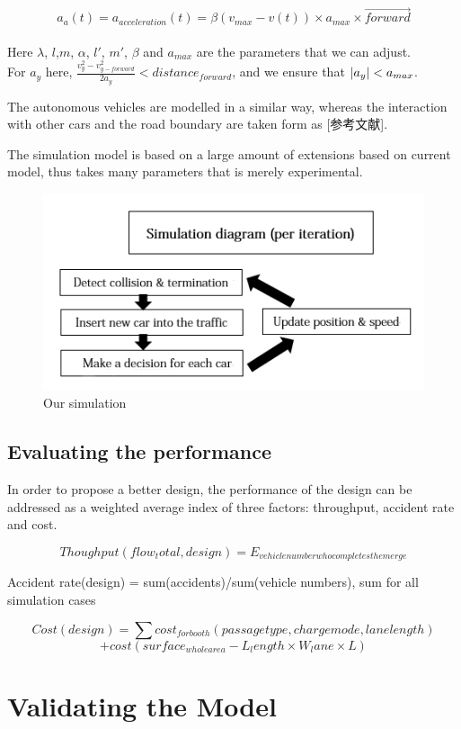 \documentclass{mcmthesis}
\begin{document}
$$a_a(t)=a_{acceleration}(t)=\beta (v_{max}-v(t)) \times a_{max} \times \overrightarrow{forward}$$\\
Here $\lambda$, $l$,$m$, $\alpha$, $l'$, $m'$, $\beta$ and $a_{max}$ are the parameters that we can adjust.\\
For $a_y$ here, $ \frac{v_y^2-v_{y-forward}^2}{2a_{y}}<distance_{forward}$, and we ensure that $\arrowvert a_y \arrowvert<a_{max}$.

The autonomous vehicles are modelled in a similar way, whereas the interaction with other cars and the road boundary are taken form as [参考文献]. 

The simulation model is based on a large amount of extensions based on current model, thus takes many parameters that is merely experimental.

\begin{figure}[htbp]
	\small 
	\centering
	\caption{Our simulation}
	\includegraphics{simulation.jpg}
\end{figure}

\subsection{Evaluating the performance}

In order to propose a better design, the performance of the design can be addressed as a weighted average index of three factors: throughput, accident rate and cost. 

$$Thoughput(flow_total, design) = E_{vehicle number who completes the merge}$$

Accident rate(design) = sum(accidents)/sum(vehicle numbers), sum for all simulation cases

$$Cost(design)=\sum cost_{for booth}(passage type,charge mode,lane length)$$
$$+cost(surface_{whole area} - L_length \times W_lane \times L) $$


\section{Validating the Model}
\end{document}
